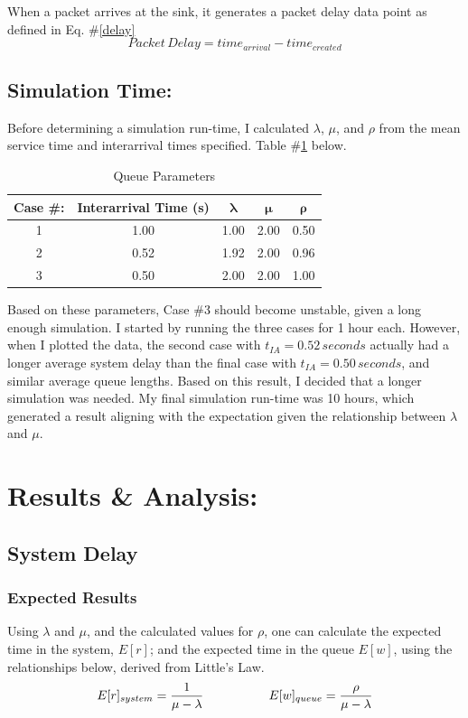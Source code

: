 \documentclass{article}
\begin{document}
When a packet arrives at the sink, it generates a packet delay data point as defined in Eq. \#\ref{delay}
\begin{equation}
	\label{delay}
	Packet \, Delay = time_{arrival} - time_{created}
\end{equation}

\newpage
\subsection*{Simulation Time:}  
Before determining a simulation run-time, I calculated $\lambda$, $\mu$, and $\rho$ from the mean service time and interarrival times specified.
Table \#\ref{Parameters} below.
\begin{table}[h!]
\centering
\begin{tabular}{|c|c|c|c|c|} \hline
\textbf{Case \#:} & \textbf{Interarrival Time (s)} & $\mathbf{\lambda}$ & $\mathbf{\mu}$ & $\mathbf{\rho}$ \\ \hline
1 & 1.00 & 1.00 & 2.00 & 0.50 \\ \hline
2 & 0.52 & 1.92 & 2.00 & 0.96 \\ \hline
3 & 0.50 & 2.00 & 2.00 & 1.00 \\ \hline 
\end{tabular}
\caption{Queue Parameters}
\label{Parameters}
\end{table}

Based on these parameters, Case \#3 should become unstable, given a long enough simulation.
I started by running the three cases for 1 hour each.  
However, when I plotted the data, the second case with $t_{IA}=0.52 \, seconds$ actually had a longer average system delay than the final case with $t_{IA}=0.50 \, seconds$, and similar average queue lengths.  
Based on this result, I decided that a longer simulation was needed.  
My final simulation run-time was 10 hours, which generated a result aligning with the expectation given the relationship between $\lambda$ and $\mu$.

\section*{Results \& Analysis:}

\subsection*{System Delay}

\subsubsection*{Expected Results}
Using $\lambda$ and $\mu$, and the calculated values for $\rho$, one can calculate the expected time in the system, $E[r]$; and the expected time in the queue $E[w]$, using the relationships below, derived from Little's Law.
\begin{align*}
E[r]_{system} = \frac{1}{\mu - \lambda} \hspace{0.15\textwidth} E[w]_{queue} = \frac{\rho}{\mu - \lambda} \\
\end{align*}
\end{document}
